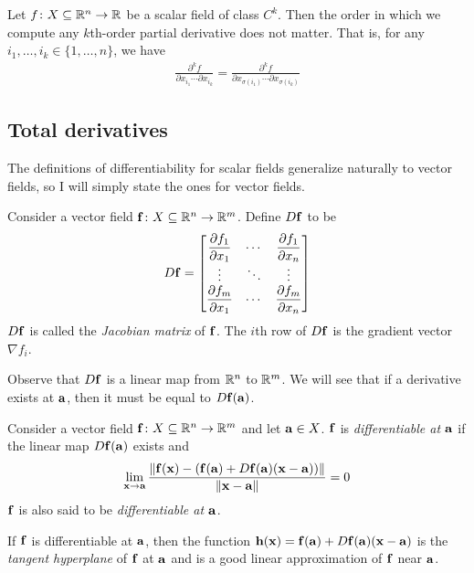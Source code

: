 \documentclass{article}
\begin{document}
\begin{theorem}
  Let $f \colon X \subseteq \mathbb{R}^n \to \mathbb{R}$ be a scalar field of class $C^k$.
  Then the order in which we compute any $k$th-order partial derivative does not matter.
  That is, for any $i_1, \ldots, i_k \in \{ 1, \ldots, n \}$, we have
  \begin{align}
    \frac{\partial^k f}{\partial x_{i_1} \cdots \partial x_{i_k}} = \frac{\partial^k f}{\partial x_{\sigma(i_1)} \cdots \partial x_{\sigma(i_k)}}
  \end{align}
\end{theorem}

\subsection{Total derivatives}

The definitions of differentiability for scalar fields generalize naturally to vector fields, so I will simply state the ones for vector fields.

\begin{definition}
  Consider a vector field $\mathbf{f} \colon X \subseteq \mathbb{R}^n \to \mathbb{R}^m$.
  Define $D\mathbf{f}$ to be
  \begin{align}
    D\mathbf{f} = \begin{bmatrix}
                  \dfrac{\partial f_1}{\partial x_1} & \cdots & \dfrac{\partial f_1}{\partial x_n}
                  \\
                  \vdots                             & \ddots & \vdots
                  \\
                  \dfrac{\partial f_m}{\partial x_1} & \cdots & \dfrac{\partial f_m}{\partial x_n}
                \end{bmatrix}
  \end{align}
  $D\mathbf{f}$ is called the \emph{Jacobian matrix} of $\mathbf{f}$.
  The $i$th row of $D\mathbf{f}$ is the gradient vector $\nabla f_i$.
\end{definition}
Observe that $D\mathbf{f}$ is a linear map from $\mathbb{R}^n$ to $\mathbb{R}^m$.
We will see that if a derivative exists at $\mathbf{a}$, then it must be equal to $D\mathbf{f}(\mathbf{a})$.

\begin{definition}[Differentiability]
  Consider a vector field $\mathbf{f} \colon X \subseteq \mathbb{R}^n \to \mathbb{R}^m$ and let $\mathbf{a} \in X$.
  $\mathbf{f}$ is \emph{differentiable at $\mathbf{a}$} if the linear map $D\mathbf{f}(\mathbf{a})$ exists and
  \begin{align}
    \lim_{\mathbf{x} \to \mathbf{a}} \frac{\norm{\mathbf{f}(\mathbf{x}) - (\mathbf{f}(\mathbf{a}) + D\mathbf{f}(\mathbf{a})(\mathbf{x} - \mathbf{a}))}}{\norm{\mathbf{x} - \mathbf{a}}} = 0
  \end{align}
  $\mathbf{f}$ is also said to be \emph{differentiable at $\mathbf{a}$}.
\end{definition}
If $\mathbf{f}$ is differentiable at $\mathbf{a}$, then the function $\mathbf{h}(\mathbf{x}) = \mathbf{f}(\mathbf{a}) + D\mathbf{f}(\mathbf{a})(\mathbf{x} - \mathbf{a})$ is the \emph{tangent hyperplane} of $\mathbf{f}$ at $\mathbf{a}$ and is a good linear approximation of $\mathbf{f}$ near $\mathbf{a}$.
\end{document}
